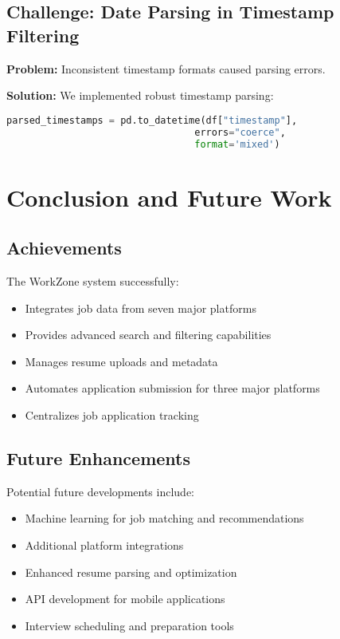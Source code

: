 \documentclass[12pt,a4paper]{article}
\begin{document}
\subsection{Challenge: Date Parsing in Timestamp Filtering}
\textbf{Problem:} Inconsistent timestamp formats caused parsing errors.

\textbf{Solution:} We implemented robust timestamp parsing:

\begin{lstlisting}[language=Python, caption=Robust Timestamp Parsing]
parsed_timestamps = pd.to_datetime(df["timestamp"], 
                                 errors="coerce", 
                                 format='mixed')
\end{lstlisting}

\section{Conclusion and Future Work}

\subsection{Achievements}
The WorkZone system successfully:
\begin{itemize}
    \item Integrates job data from seven major platforms
    \item Provides advanced search and filtering capabilities
    \item Manages resume uploads and metadata
    \item Automates application submission for three major platforms
    \item Centralizes job application tracking
\end{itemize}

\subsection{Future Enhancements}
Potential future developments include:
\begin{itemize}
    \item Machine learning for job matching and recommendations
    \item Additional platform integrations
    \item Enhanced resume parsing and optimization
    \item API development for mobile applications
    \item Interview scheduling and preparation tools
\end{itemize}
\end{document}
